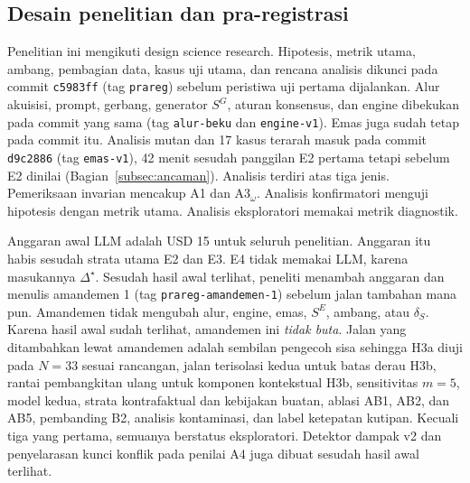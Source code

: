 \documentclass[conference]{IEEEtran}
\makeatletter
\DeclareRobustCommand{\en}[1]{{\usefont{\f@encoding}{\f@family}{\f@series}{it}#1\/}}
\newcommand{\emas}{\star}
\newcommand{\SG}{S^{G}}
\newcommand{\SE}{S^{E}}
\makeatother
\begin{document}
\subsection{Desain penelitian dan pra-registrasi}
Penelitian ini mengikuti \en{design science research}. Hipotesis, metrik utama, ambang, pembagian data, kasus uji utama, dan rencana analisis dikunci pada \en{commit} \texttt{c5983ff} (\en{tag} \texttt{prareg}) sebelum peristiwa uji pertama dijalankan. Alur akuisisi, \en{prompt}, gerbang, generator $\SG$, aturan konsensus, dan \en{engine} dibekukan pada \en{commit} yang sama (\en{tag} \texttt{alur-beku} dan \texttt{engine-v1}). Emas juga sudah tetap pada \en{commit} itu. Analisis mutan dan 17 kasus terarah masuk pada \en{commit} \texttt{d9c2886} (\en{tag} \texttt{emas-v1}), 42 menit sesudah panggilan E2 pertama tetapi sebelum E2 dinilai (Bagian~\ref{subsec:ancaman}). Analisis terdiri atas tiga jenis. Pemeriksaan invarian mencakup A1 dan A3$_\omega$. Analisis konfirmatori menguji hipotesis dengan metrik utama. Analisis eksploratori memakai metrik diagnostik.

Anggaran awal LLM adalah USD 15 untuk seluruh penelitian. Anggaran itu habis sesudah strata utama E2 dan E3. E4 tidak memakai LLM, karena masukannya $\Delta^{\emas}$. Sesudah hasil awal terlihat, peneliti menambah anggaran dan menulis amandemen 1 (\en{tag} \texttt{prareg-amandemen-1}) sebelum jalan tambahan mana pun. Amandemen tidak mengubah alur, \en{engine}, emas, $\SE$, ambang, atau $\delta_S$. Karena hasil awal sudah terlihat, amandemen ini \emph{tidak buta}. Jalan yang ditambahkan lewat amandemen adalah sembilan pengecoh sisa sehingga H3a diuji pada $N = 33$ sesuai rancangan, jalan terisolasi kedua untuk batas derau H3b, rantai pembangkitan ulang untuk komponen kontekstual H3b, sensitivitas $m = 5$, model kedua, strata kontrafaktual dan kebijakan buatan, ablasi AB1, AB2, dan AB5, pembanding B2, analisis kontaminasi, dan label ketepatan kutipan. Kecuali tiga yang pertama, semuanya berstatus eksploratori. Detektor dampak v2 dan penyelarasan kunci konflik pada penilai A4 juga dibuat sesudah hasil awal terlihat.
\end{document}
